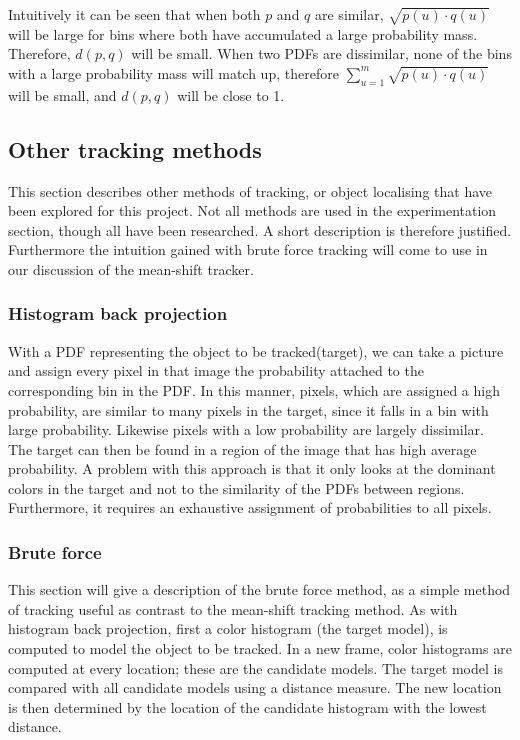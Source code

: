 \documentclass[a4paper,11pt]{article}
\begin{document}
Intuitively it can be seen that when both $p$ and $q$ are similar, $\sqrt{p(u)\cdot q(u)}$ will be large for bins where both have accumulated a large probability mass. Therefore, $d(p,q)$ will be small. When two PDFs are dissimilar, none of the bins with a large probability mass will match up, therefore  $\sum_{u=1}^{m} \sqrt{p(u)\cdot q(u)}$ will be small, and $d(p,q)$ will be close to 1.






\subsection{Other tracking methods}

This section describes other methods of tracking, or object localising that have been explored for this project. Not all methods are used in the experimentation section, though all have been researched. A short description is therefore justified. Furthermore the intuition gained with brute force tracking will come to use in our discussion of the mean-shift tracker.



\subsubsection{Histogram back projection}

With a PDF representing the object to be tracked(target), we can take a picture and assign every pixel in that image the probability attached to the corresponding bin in the PDF. In this manner, pixels, which are assigned a high probability, are similar to many pixels in the target, since it falls in a bin with large probability. Likewise pixels with a low probability are largely dissimilar. The target can then be found in a region of the image that has high average probability. A problem with this approach is that it only looks at the dominant colors in the target and not to the similarity of the PDFs between regions. Furthermore, it requires an exhaustive assignment of probabilities to all pixels.


\subsubsection{Brute force}
This section will give a description of the brute force method, as a simple method of tracking useful as contrast to the mean-shift tracking method. As with histogram back projection, first a color histogram (the target model), is computed to model the object to be tracked. In a new frame, color histograms are computed at every location; these are the candidate models. The target model is compared with all candidate models using a distance measure. The new location is then determined by the location of the candidate histogram with the lowest distance.
\end{document}
